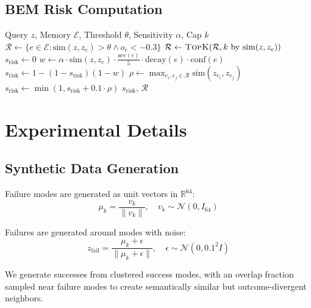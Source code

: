 \documentclass[twoside,11pt]{article}
\newcommand{\R}{\mathbb{R}}
\begin{document}
\subsection{BEM Risk Computation}
\begin{algorithm}[H]
\caption{BEM Risk Signal Computation}
\begin{algorithmic}[1]
\Require Query $z$, Memory $\mathcal{E}$, Threshold $\theta$, Sensitivity $\alpha$, Cap $k$
\State $\mathcal{R} \leftarrow \{e \in \mathcal{E} : \text{sim}(z, z_e) > \theta \land o_e < -0.3\}$
\State $\mathcal{R} \leftarrow \textsc{TopK}(\mathcal{R}, k\text{ by }\text{sim}(z, z_e))$
\State $s_{\text{risk}} \leftarrow 0$
    \State $w \leftarrow \alpha \cdot \text{sim}(z, z_e) \cdot \frac{\text{sev}(e)}{5} \cdot \text{decay}(e) \cdot \text{conf}(e)$
    \State $s_{\text{risk}} \leftarrow 1 - (1 - s_{\text{risk}})(1 - w)$ 
\EndFor
{}
    \State $\rho \leftarrow \max_{e_i, e_j \in \mathcal{R}} \text{sim}(z_{e_i}, z_{e_j})$
    \State $s_{\text{risk}} \leftarrow \min(1, s_{\text{risk}} + 0.1 \cdot \rho)$ 
\EndIf
\State \Return $s_{\text{risk}}$, $\mathcal{R}$
\end{algorithmic}
\end{algorithm}

\section{Experimental Details}

\subsection{Synthetic Data Generation}

Failure modes are generated as unit vectors in $\R^{64}$:
\begin{equation}
    \mu_k = \frac{v_k}{\|v_k\|}, \quad v_k \sim \mathcal{N}(0, I_{64})
\end{equation}

Failures are generated around modes with noise:
\begin{equation}
    z_{\text{fail}} = \frac{\mu_k + \epsilon}{\|\mu_k + \epsilon\|}, \quad \epsilon \sim \mathcal{N}(0, 0.1^2 I)
\end{equation}

We generate successes from clustered success modes, with an overlap fraction sampled near failure modes to create semantically similar but outcome-divergent neighbors.
\end{document}
